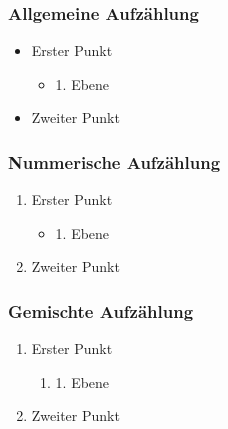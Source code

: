 \subsubsection{Allgemeine Aufzählung}
\label{sec:Allgemeine Aufzählung}
\begin{itemize}
\item Erster Punkt
	\begin{itemize}
		\item 1. Ebene
	\end{itemize}
\item Zweiter Punkt
\end{itemize}

\subsubsection{Nummerische Aufzählung}
\label{sec:Nummerische Aufzählung}
\begin{enumerate} 
\item Erster Punkt
	\begin{itemize}
		\item 1. Ebene
	\end{itemize}
\item Zweiter Punkt
\end{enumerate}

\subsubsection{Gemischte Aufzählung}
\label{sec:Gemischte Aufzählung}
\begin{enumerate} 
	\item Erster Punkt
	\begin{enumerate}
		\item 1. Ebene
	\end{enumerate}
	\item Zweiter Punkt
\end{enumerate}
